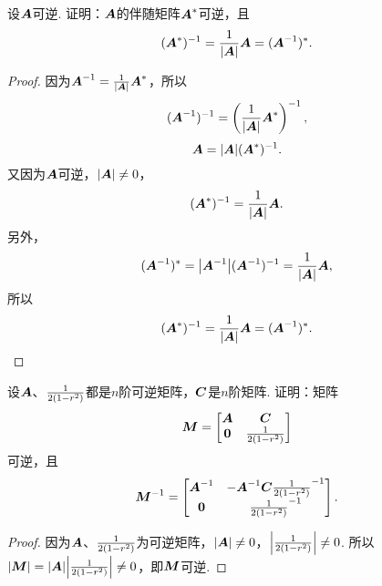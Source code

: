 \begin{example}
设\(\A\)可逆.
证明：\(\A\)的伴随矩阵\(\A^*\)可逆，且
\begin{equation}
	(\A^*)^{-1}=\frac{1}{\abs{\A}}\A=(\A^{-1})^*.
\end{equation}
\begin{proof}
因为\(\A^{-1}=\frac{1}{\abs{\A}} \A^*\)，所以\[
(\A^{-1})^{-1} = \left( \frac{1}{\abs{\A}} \A^* \right)^{-1},
\]\[
\A = \abs{\A} (\A^*)^{-1}.
\]又因为\(\A\)可逆，\(\abs{\A}\neq0\)，\[
(\A^*)^{-1} = \frac{1}{\abs{\A}} \A.
\]另外，\[
(\A^{-1})^* = \abs{\A^{-1}} (\A^{-1})^{-1}
= \frac{1}{\abs{\A}} \A,
\]所以\[
(\A^*)^{-1}=\frac{1}{\abs{\A}}\A=(\A^{-1})^*.
\qedhere
\]
\end{proof}
\end{example}

\begin{example}
设\(\A\)、\(\B\)都是\(n\)阶可逆矩阵，\(\C\)是\(n\)阶矩阵.
证明：矩阵\[
\mat{M} = \begin{bmatrix}
\A & \C \\
\z & \B
\end{bmatrix}
\]可逆，且\[
\mat{M}^{-1} = \begin{bmatrix}
\A^{-1} & -\A^{-1} \C \B^{-1} \\
\z & \B^{-1}
\end{bmatrix}.
\]
\begin{proof}
因为\(\A\)、\(\B\)为可逆矩阵，\(\abs{\A} \neq 0\)，\(\abs{\B} \neq 0\).
所以\(\abs{\mat{M}}=\abs{\A}\abs{\B} \neq 0\)，即\(\mat{M}\)可逆.


\end{proof}
\end{example}
